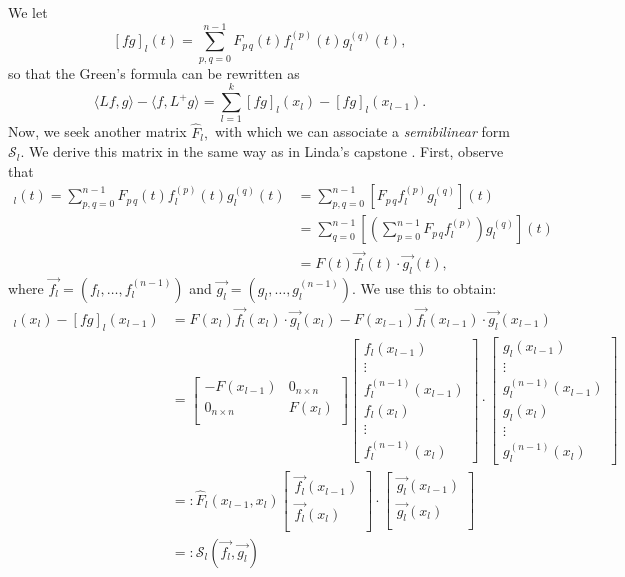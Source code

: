 \documentclass[11pt,reqno,oneside,a4paper]{article}
\theoremstyle{plain} %
\theoremstyle{definition}
\theoremstyle{remark}
\begin{document}
We let 
\[ 
[fg]_l(t) = \sum_{p,q=0}^{n-1}F_{p\,q}(t)f_l^{(p)}(t)g_l^{(q)}(t),
\]
so that the Green's formula can be rewritten as 
\[ \langle Lf,g\rangle - \langle f,L^+ g\rangle = \sum_{l=1}^{k} [fg]_l(x_l) - [fg]_l(x_{l-1}).\]
Now, we seek another matrix $\widehat{F}_l,$ with which we can associate a \emph{semibilinear} form $\mathcal{S}_l$. We derive this matrix in the same way as in Linda's capstone \cite{linfan}. First, observe that 
\begin{align*}
[fg]_l(t) = \sum_{p,q=0}^{n-1}F_{p\,q}(t) f_l^{(p)}(t)g_l^{(q)}(t) &= \sum_{p,q=0}^{n-1}\left[F_{p\,q} f_l^{(p)} g_l^{(q)}\right](t)  \\
&= \sum_{q=0}^{n-1}\left[ \left(\sum_{p=0}^{n-1} F_{p\,q} f_l^{(p)}\right) g_l^{(q)}\right](t) \\
&= F(t) \vec{f_l}(t) \cdot \vec{g_l}(t), 
\end{align*}
where $\vec{f_l} = (f_l, \ldots, f_l^{(n-1)})$ and $\vec{g_l} = (g_l, \ldots, g_l^{(n-1)}).$ We use this to obtain:
\begin{align*}
[fg]_l(x_l) - [fg]_l(x_{l-1}) &= F(x_l) \vec{f_l}(x_l) \cdot \vec{g_l}(x_l) - F(x_{l-1}) \vec{f_l}(x_{l-1}) \cdot \vec{g_l}(x_{l-1}) \\
&= \begin{bmatrix}
- F(x_{l-1}) & 0_{n\times n} \\
0_{n\times n} &  F(x_{l}) \\
\end{bmatrix}
\begin{bmatrix}
f_l(x_{l-1})  \\
\vdots \\
f_l^{(n-1)}(x_{l-1}) \\
f_l(x_{l})  \\
\vdots \\
f_l^{(n-1)}(x_{l}) 
\end{bmatrix}
\cdot
\begin{bmatrix}
g_l(x_{l-1})  \\
\vdots \\
g_l^{(n-1)}(x_{l-1}) \\
g_l(x_{l})  \\
\vdots \\
g_l^{(n-1)}(x_{l}) 
\end{bmatrix} \\
&=: \widehat{F}_l(x_{l-1}, x_l)  
\begin{bmatrix}
\vec{f_l}(x_{l-1})  \\
\vec{f_l}(x_{l})  \\
\end{bmatrix}
\cdot
\begin{bmatrix}
\vec{g_l}(x_{l-1})  \\
\vec{g_l}(x_{l})  \\
\end{bmatrix} \\
&=: \mathcal{S}_l (\vec{f_l}, \vec{g_l})
\end{align*}
\end{document}
